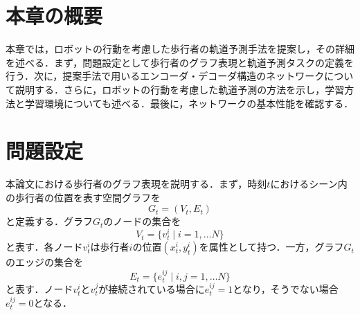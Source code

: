 
\section{本章の概要}


本章では，ロボットの行動を考慮した歩行者の軌道予測手法を提案し，その詳細を述べる．まず，問題設定として歩行者のグラフ表現と軌道予測タスクの定義を行う．次に，提案手法で用いるエンコーダ・デコーダ構造のネットワークについて説明する．さらに，ロボットの行動を考慮した軌道予測の方法を示し，学習方法と学習環境についても述べる．最後に，ネットワークの基本性能を確認する．



\section{問題設定}
本論文における歩行者のグラフ表現を説明する．まず，時刻$t$におけるシーン内の歩行者の位置を表す空間グラフを
\begin{equation}
  G_t = (V_t, E_t)
\end{equation}
と定義する．グラフ$G_t$のノードの集合を
\begin{equation}
  V_t = \{ v^i_t \mid i = 1, \dots N \}
\end{equation}
と表す．各ノード$v^i_t$は歩行者$i$の位置$(x^i_t, y^i_t)$を属性として持つ．一方，グラフ$G_t$のエッジの集合を
\begin{equation}
  E_t = \{ e^{ij}_t \mid i, j = 1, \dots N \}
\end{equation}
と表す．ノード$v^i_t$と$v^j_t$が接続されている場合に$e^{ij}_t=1$となり，そうでない場合$e^{ij}_t=0$となる．

